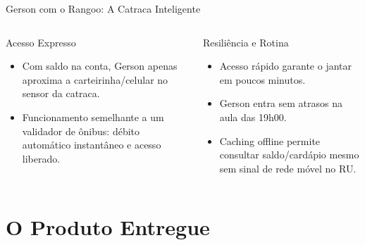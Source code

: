 \documentclass[10pt, aspectratio=169]{beamer}
\begin{document}
\begin{frame}{Gerson com o Rangoo: A Catraca Inteligente}
  \begin{columns}[T,onlytextwidth]
      \begin{block}{Acesso Expresso}
        \small
        \begin{itemize}
          \item Com saldo na conta, Gerson apenas aproxima a carteirinha/celular no sensor da catraca.
          \item Funcionamento semelhante a um validador de ônibus: débito automático instantâneo e acesso liberado.
        \end{itemize}
      \end{block}

      \begin{block}{Resiliência e Rotina}
        \small
        \begin{itemize}
          \item Acesso rápido garante o jantar em poucos minutos.
          \item Gerson entra sem atrasos na aula das 19h00.
          \item Caching offline permite consultar saldo/cardápio mesmo sem sinal de rede móvel no RU.
        \end{itemize}
      \end{block}
  \end{columns}
\end{frame}

\section{O Produto Entregue}
\end{document}
